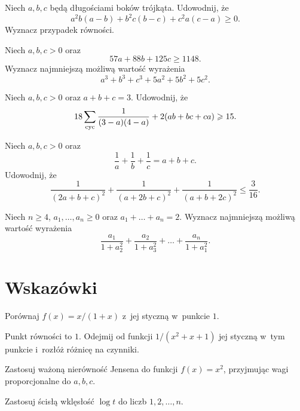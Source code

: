 \documentclass{lecture-kuznia}
\begin{document}
\begin{problem}\label{ZRaviJensen}
	Niech $a,b,c$ będą długościami boków trójkąta. Udowodnij, że
	\[
		a^2b(a-b)+b^2c(b-c)+c^2a(c-a)\geqslant0.
	\]
	Wyznacz przypadek równości.
\end{problem}

\begin{problem}\label{Z12}
	Niech $a,b,c>0$ oraz
	\[
		57a+88b+125c\geqslant1148.
	\]
	Wyznacz najmniejszą możliwą wartość wyrażenia
	\[
		a^3+b^3+c^3+5a^2+5b^2+5c^2.
	\]
\end{problem}

\begin{problem}\label{Z13}
	Niech $a,b,c>0$ oraz $a+b+c=3$. Udowodnij, że
	\[
		18\sum_{\rm cyc}\frac1{(3-a)(4-a)}+2(ab+bc+ca)\geqslant15.
	\]
\end{problem}

\begin{problem}\label{ZHomoJensen}
	Niech $a,b,c>0$ oraz
	\[
		\frac1a+\frac1b+\frac1c=a+b+c.
	\]
	Udowodnij, że
	\[
		\frac1{(2a+b+c)^2}+\frac1{(a+2b+c)^2}
		+\frac1{(a+b+2c)^2}\leqslant\frac3{16}.
	\]
\end{problem}

\begin{problem}\label{Z15}
	Niech $n\geqslant4$, $a_1,\dots,a_n\geqslant0$ oraz
	$a_1+\dots+a_n=2$. Wyznacz najmniejszą możliwą wartość wyrażenia
	\[
		\frac{a_1}{1+a_2^2}+\frac{a_2}{1+a_3^2}
		+\dots+\frac{a_n}{1+a_1^2}.
	\]
\end{problem}

\ifshowsolutions
\newpage
\section{Wskazówki}

\begin{hint*}[\ref{Z1}]
	Porównaj $f(x)=x/(1+x)$ z~jej styczną w~punkcie $1$.
\end{hint*}

\begin{hint*}[\ref{Z2}]
	Punkt równości to $1$. Odejmij od funkcji $1/(x^2+x+1)$ jej styczną
	w~tym punkcie i~rozłóż różnicę na czynniki.
\end{hint*}

\begin{hint*}[\ref{ZKwadratWazony}]
	Zastosuj ważoną nierówność Jensena do funkcji $f(x)=x^2$, przyjmując
	wagi proporcjonalne do $a,b,c$.
\end{hint*}

\begin{hint*}[\ref{Z6}]
	Zastosuj ścisłą wklęsłość $\log t$ do liczb $1,2,\dots,n$.
\end{hint*}
\end{document}

